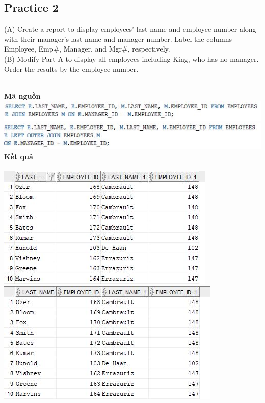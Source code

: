 \documentclass[12pt,a4paper]{report}
\begin{document}
\subsection{Practice 2}
\begin{boxedminipage}[t]{15.5cm}
	(A) Create a report to display employees’ last name and employee number along with 
	their manager’s last name and manager number. Label the columns Employee, Emp\#, Manager, and Mgr\#, respectively.\\
	(B) Modify Part A to display all employees including King, who has no manager. Order the results by the employee number.
\end{boxedminipage}
\newline
\\
\textbf{Mã nguồn}
\\
\newline
\includegraphics[scale=1]{26a.jpg}\\
\includegraphics[scale=1]{26b.jpg}\\
\textbf{Kết quả}\\\\
\includegraphics[scale=1]{k26a.jpg}\\
\includegraphics[scale=1]{k26b.jpg}
\end{document}
